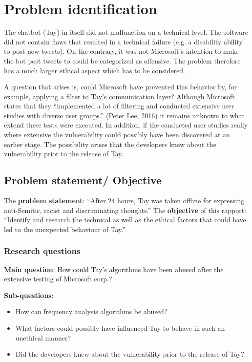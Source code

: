 \chapter{Problem identification}
The chatbot (Tay) in itself did not malfunction on a technical level. The software did not contain flaws that resulted in a technical failure (e.g. a disability ability to post new tweets). On the contrary, it was not Microsoft’s intention to make the bot post tweets to could be categorized as offensive. The problem therefore has a much larger ethical aspect which has to be considered.

A question that arises is, could Microsoft have prevented this behavior by, for example, applying a filter to Tay’s communication layer? Although Microsoft states that they “implemented a lot of filtering and conducted extensive user studies with diverse user groups.” (Peter Lee, 2016) it remains unknown to what extend these tests were executed. In addition, if the conducted user studies really where extensive the vulnerability could possibly have been discovered at an earlier stage. The possibility arises that the developers knew about the vulnerability prior to the release of Tay.

\newpage

\section{Problem statement/ Objective}
The \textbf{problem statement}: “After 24 hours, Tay was taken offline for expressing anti-Semitic, racist and discriminating thoughts.”
The \textbf{objective} of this rapport: “Identify and research the technical as well as the ethical factors that could have led to the unexpected behaviour of Tay.”

\subsection{Research questions}
\textbf{Main question}: How could Tay’s algorithms have been abused after the extensive testing of Microsoft corp.?

\textbf{Sub-questions}:
\begin{itemize}
	\item How can frequency analysis algorithms be abused?
	\item What factors could possibly have influenced Tay to behave in such an unethical manner?
	\item Did the developers knew about the vulnerability prior to the release of Tay?
\end{itemize}